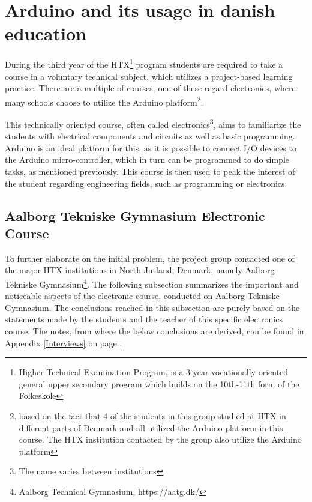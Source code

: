 
\section{Arduino and its usage in danish education}
During the third year of the HTX\footnote{Higher Technical Examination Program, is a 3-year vocationally oriented general upper secondary program which builds on the 10th-11th form of the Folkeskole\cite{htx_wiki}} program students are required to take a course in a voluntary technical subject, which utilizes a project-based learning practice. 
There are a multiple of courses, one of these regard electronics, where many schools choose to utilize the Arduino platform\footnote{based on the fact that 4 of the students in this group studied at HTX in different parts of Denmark and all utilized the Arduino platform in this course. 
The HTX institution contacted by the group also utilize the Arduino platform}\cite{holstebro_education}.

This technically oriented course, often called electronics\footnote{The name varies between institutions}, aims to familiarize the students with electrical components and circuits as well as basic programming\cite{holstebro_electronic}.
Arduino is an ideal platform for this, as it is possible to connect I/O devices to the Arduino micro-controller, which in turn can be programmed to do simple tasks, as mentioned previously. 
This course is then used to peak the interest of the student regarding engineering fields, such as programming or electronics.

\subsection{Aalborg Tekniske Gymnasium Electronic Course}
\label{htxinter}
To further elaborate on the initial problem, the project group contacted one of the major HTX institutions in North Jutland, Denmark, namely Aalborg Tekniske Gymnasium\footnote{Aalborg Technical Gymnasium, https://aatg.dk/}. 
The following subsection summarizes the important and noticeable aspects of the electronic course, conducted on Aalborg Tekniske Gymnasium. 
The conclusions reached in this subsection are purely based on the statements made by the students and the teacher of this specific electronics course.
The notes, from where the below conclusions are derived, can be found in Appendix \ref{Interviews} on page \pageref{Interviews}.

